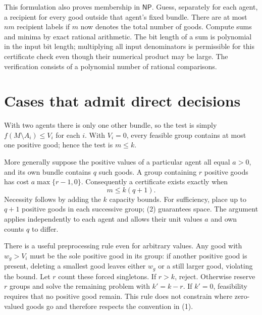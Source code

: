 \documentclass[11pt]{article}
\begin{document}
This formulation also proves membership in $\mathsf{NP}$. Guess, separately
for each agent, a recipient for every good outside that agent's fixed
bundle. There are at most $nm$ recipient labels if $m$ now denotes the total
number of goods. Compute sums and minima by exact rational arithmetic.
The bit length of a sum is polynomial in the input bit length; multiplying
all input denominators is permissible for this certificate check even
though their numerical product may be large. The verification consists
of a polynomial number of rational comparisons.

\section*{Cases that admit direct decisions}
With two agents there is only one other bundle, so the test is simply
$f(M\setminus A_i)\leq V_i$ for each $i$. With $V_i=0$, every feasible group
contains at most one positive good; hence the test is $m\leq k$.

More generally suppose the positive values of a particular agent all equal
$a>0$, and its own bundle contains $q$ such goods. A group containing $r$
positive goods has cost $a\max\{r-1,0\}$. Consequently a certificate exists
exactly when
\[
                 m\leq k(q+1).                      \tag{2}
\]
Necessity follows by adding the $k$ capacity bounds. For sufficiency, place
up to $q+1$ positive goods in each successive group; (2) guarantees space.
The argument applies independently to each agent and allows their unit
values $a$ and own counts $q$ to differ.

There is a useful preprocessing rule even for arbitrary values. Any good
with $w_g>V_i$ must be the sole positive good in its group: if another
positive good is present, deleting a smallest good leaves either $w_g$ or
a still larger good, violating the bound. Let $r$ count these forced
singletons. If $r>k$, reject. Otherwise reserve $r$ groups and solve the
remaining problem with $k'=k-r$. If $k'=0$, feasibility requires that no
positive good remain. This rule does not constrain where zero-valued goods
go and therefore respects the convention in (1).
\end{document}
